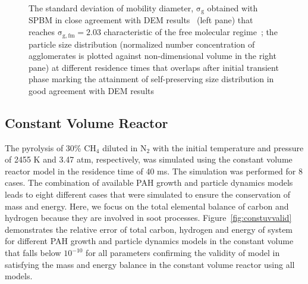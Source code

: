 \begin{figure}[H]
\begin{subfigure}[t]{0.4\textwidth}
	\end{subfigure}
	\caption{The standard deviation of mobility diameter, $\mathrm{\sigma_g}$ obtained with SPBM in close agreement with DEM results~\citep{kholghy2021surface} (left pane) that reaches $\mathrm{\sigma_{g,fm}=2.03}$ characteristic of the free molecular regime~\citep{vemury1995self}; the particle size distribution (normalized number concentration of agglomerates is plotted against non-dimensional volume in the right pane) at different residence times that overlaps after initial transient phase marking the attainment of self-preserving size distribution in good agreement with DEM results~\citep{goudeli2015coagulation}}
	\label{fig:coagvalid_sigmapsd} 
\end{figure}



\subsection{Constant Volume Reactor}
The pyrolysis of 30\% $\mathrm{CH_4}$ diluted in $\mathrm{N_2}$ with the initial temperature and pressure of 2455 K and 3.47 atm, respectively, was simulated using the constant volume reactor model in the residence time of 40 ms. The simulation was performed for 8 cases. The combination of available PAH growth and particle dynamics models leads to eight different cases that were simulated to ensure the conservation of mass and energy. Here, we focus on the total elemental balance of carbon and hydrogen because they are involved in soot processes. %
Figure~\ref{fig:constuvvalid} demonstrates the relative error of total carbon, hydrogen and energy of system for different PAH growth and particle dynamics models in the constant volume that falls below $\mathrm{10^{-10}}$ for all parameters confirming the validity of model in satisfying the mass and energy balance in the constant volume reactor using all models. 

